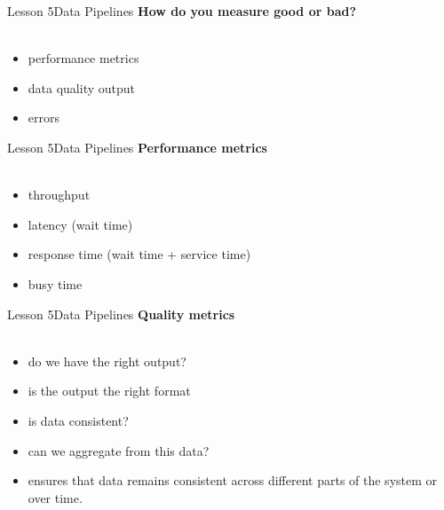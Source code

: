 \documentclass[aspectratio=1610]{beamer}
\begin{document}
\begin{frame}{Lesson 5}{Data Pipelines}
\LARGE
\textbf{How do you measure good or bad?}\\~\\
\begin{itemize}
    \item performance metrics
    \item data quality output
    \item errors
\end{itemize}
\end{frame}




\begin{frame}{Lesson 5}{Data Pipelines}
\LARGE
\textbf{Performance metrics}\\~\\
\begin{itemize}
    \item throughput
    \item latency (wait time)
    \item response time (wait time + service time)
    \item busy time
\end{itemize}
\end{frame}



\begin{frame}{Lesson 5}{Data Pipelines}
\LARGE
\textbf{Quality metrics}\\~\\
\begin{itemize}
    \item do we have the right output?
    \item is the output the right format
    \item is data consistent? 
    \item can we aggregate from this data?
    \item ensures that data remains consistent across different parts of the system or over time.
\end{itemize}
\end{frame}
\end{document}
